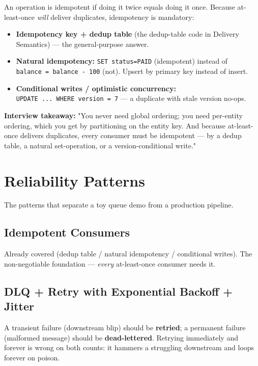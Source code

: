 \documentclass[11pt]{article}
\providecommand{\tightlist}{\setlength{\itemsep}{1pt}\setlength{\parskip}{0pt}}
\begin{document}
An operation is idempotent if doing it twice equals doing it once. Because at-least-once \emph{will} deliver duplicates, idempotency is mandatory:

\begin{itemize}
\tightlist
\item
  \textbf{Idempotency key + dedup table} (the dedup-table code in Delivery Semantics) --- the general-purpose answer.
\item
  \textbf{Natural idempotency:} \texttt{SET\ status=\textquotesingle{}PAID\textquotesingle{}} (idempotent) instead of \texttt{balance\ =\ balance\ -\ 100} (not). Upsert by primary key instead of insert.
\item
  \textbf{Conditional writes / optimistic concurrency:} \texttt{UPDATE\ ...\ WHERE\ version\ =\ 7} --- a duplicate with stale version no-ops.
\end{itemize}

\textbf{Interview takeaway:} "You never need global ordering; you need per-entity ordering, which you get by partitioning on the entity key. And because at-least-once delivers duplicates, every consumer must be idempotent --- by a dedup table, a natural set-operation, or a version-conditional write."

\section{Reliability Patterns}\label{reliability-patterns}

The patterns that separate a toy queue demo from a production pipeline.

\subsection{Idempotent Consumers}\label{idempotent-consumers}

Already covered (dedup table / natural idempotency / conditional writes). The non-negotiable foundation --- \emph{every} at-least-once consumer needs it.

\subsection{DLQ + Retry with Exponential Backoff + Jitter}\label{dlq--retry-with-exponential-backoff--jitter}

A transient failure (downstream blip) should be \textbf{retried}; a permanent failure (malformed message) should be \textbf{dead-lettered}. Retrying immediately and forever is wrong on both counts: it hammers a struggling downstream and loops forever on poison.
\end{document}
